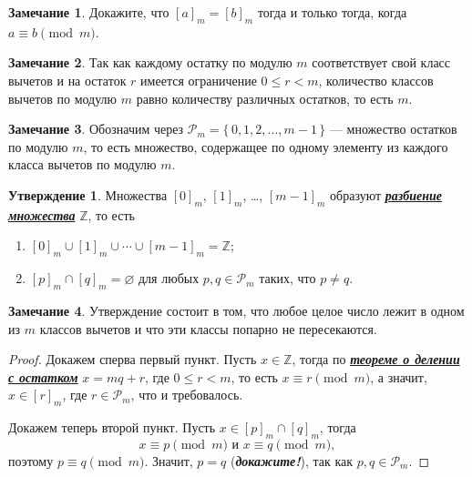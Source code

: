 \documentclass[14pt, a4paper]{extarticle}
\theoremstyle{definition}
\newtheorem*{remark}{Замечание}
\newtheorem{statement}{Утверждение}
\begin{document}
	\begin{remark}
		Докажите, что $[a]_m=[b]_m$ тогда и только тогда, когда $a\equiv b\pmod{m}$.
	\end{remark}
	
	\begin{remark}
		Так как каждому остатку по модулю $m$ соответствует свой класс вычетов и на остаток $r$ имеется ограничение $0\leqslant r<m$, количество классов вычетов по модулю $m$ равно количеству различных остатков, то есть $m$.
	\end{remark}
	
	\begin{remark}
		Обозначим через $\mathcal{P}_m=\{\,0,1,2,\dots,m-1\,\}$ --- множество остатков по модулю $m$, то есть множество, содержащее по одному элементу из каждого класса вычетов по модулю $m$.
	\end{remark}
	
	\begin{statement}
		Множества $[0]_m$, $[1]_m$, \dots, $[m-1]_m$ образуют \href{https://ru.wikipedia.org/wiki/%D0%A0%D0%B0%D0%B7%D0%B1%D0%B8%D0%B5%D0%BD%D0%B8%D0%B5_%D0%BC%D0%BD%D0%BE%D0%B6%D0%B5%D1%81%D1%82%D0%B2%D0%B0}{\textbf{\textit{разбиение множества}}} $\mathbb{Z}$, то есть
		\begin{enumerate}[topsep=0pt,itemsep=-1ex,partopsep=1ex,parsep=1ex]
			\item $[0]_m\cup[1]_m\cup\cdots\cup[m-1]_m=\mathbb{Z}$;
			\item $[p]_m\cap[q]_m=\varnothing$ для любых $p,q\in\mathcal{P}_m$ таких, что $p\neq q$.
		\end{enumerate}
	\end{statement}
	\begin{remark}
		Утверждение состоит в том, что любое целое число лежит в одном из $m$ классов вычетов и что эти классы попарно не пересекаются.
	\end{remark}
	\begin{proof}
		Докажем сперва первый пункт. Пусть $x\in\mathbb{Z}$, тогда по \hyperref[ost]{\textbf{\textit{теореме о делении с остатком}}} $x=mq+r$, где $0\leqslant r<m$, то есть $x\equiv r\pmod{m}$, а значит, $x\in[r]_m$, где $r\in\mathcal{P}_m$, что и требовалось.
		
		Докажем теперь второй пункт. Пусть $x\in[p]_m\cap[q]_m$, тогда $$x\equiv p\pmod{m}\text{ и }x\equiv q\pmod{m},$$ поэтому $p\equiv q\pmod{m}$. Значит, $p=q$ (\textbf{\textit{докажите!}}), так как \mbox{$p,q\in\mathcal{P}_m$}.
	\end{proof}
\end{document}
